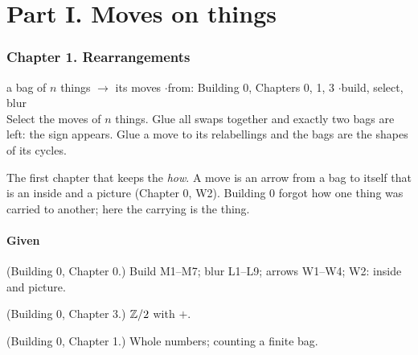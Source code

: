 
\part*{Part I. Moves on things}

\section*{Chapter 1. Rearrangements}
\begin{center}
{\normalsize a bag of $n$ things $\to$ its moves \quad$\cdot$\quad from: Building 0, Chapters 0, 1, 3 \quad$\cdot$\quad build, select, blur}\\[4pt]
{\small Select the moves of $n$ things. Glue all swaps together and exactly two bags are left: the sign appears. Glue a move to its relabellings and the bags are the shapes of its cycles.}
\end{center}

The first chapter that keeps the \emph{how}. A move is an arrow from a bag to itself that is an inside and a picture (Chapter 0, W2). Building 0 forgot how one thing was carried to another; here the carrying is the thing.

\subsection*{Given}

\begin{lines}
\item[\lab{G1}] (Building 0, Chapter 0.) Build M1--M7; blur L1--L9; arrows W1--W4; W2: inside and picture.
\item[\lab{G2}] (Building 0, Chapter 3.) $\mathbb{Z}/2$ with $+$.
\item[\lab{G3}] (Building 0, Chapter 1.) Whole numbers; counting a finite bag.
\end{lines}

